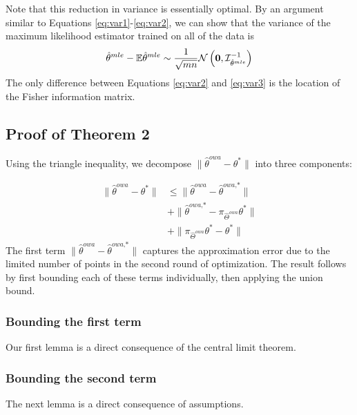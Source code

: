 \documentclass[twoside]{article}
\newtheorem{lemma}{Lemma}
\newcommand{\zero}{\text{\textbf{0}}}
\newcommand{\Wowa}{{\hat \Theta^{\textit{owa}}}}
\newcommand{\E}{\mathbb{E}}
\newcommand{\w}{\theta}
\newcommand{\wowa}{\hat\w^{owa}}
\newcommand{\wowastar}{\hat\w^{\textit{owa,*}}}
\newcommand{\wmle}{\hat\w^{mle}}
\newcommand{\wstar}{{\w^{*}}}
\newcommand{\I}{\mathcal I}
\newcommand{\normal}[2]{\ensuremath{\mathcal{N}\left({{#1}},{{#2}}\right)}}
\newcommand{\ltwo}[1]{{\lVert {#1} \rVert}}
\newcommand{\proj}[1]{\pi_{{#1}}}
\begin{document}
Note that this reduction in variance is essentially optimal.
By an argument similar to Equations \ref{eq:var1}-\ref{eq:var2},
we can show that the variance of the maximum likelihood estimator trained on all of the data is
\begin{equation}
\wmle - \E\wmle \sim \frac{1}{\sqrt{mn}} \normal{\zero}{\I^{-1}_{\wmle}}
\label{eq:var3}
\end{equation}
The only difference between Equations \ref{eq:var2} and \ref{eq:var3} is the location of the Fisher information matrix.

\subsection {Proof of Theorem 2}

Using the triangle inequality, we decompose $\ltwo{\wowa-\wstar}$ into three components:

\begin{equation}
\begin{aligned}
\ltwo{\wowa-\wstar}
&\le
\ltwo{\wowa-\wowastar}
\\&
+
\ltwo{\wowastar - \proj{\Wowa}\wstar}
\\&
+
\ltwo{\proj{\Wowa}\wstar - \wstar}
\end{aligned}
\end{equation}
The first term $\ltwo{\wowa-\wowastar}$ captures the approximation error due to the limited number of points in the second round of optimization.
The result follows by first bounding each of these terms individually,
then applying the union bound.

\subsubsection{Bounding the first term}

Our first lemma is a direct consequence of the central limit theorem.

\subsubsection{Bounding the second term}
The next lemma is a direct consequence of assumptions.
\end{document}
